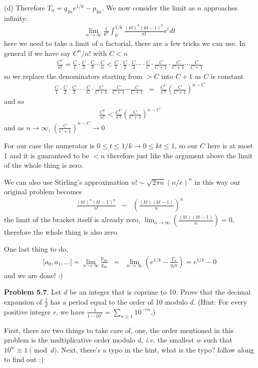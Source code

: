 \documentclass[aps,preprint,preprintnumbers,nofootinbib,showpacs,prd]{revtex4-1}
\newcommand{\ie}{{\it i.e.} }
\newcommand{\nbea}{\begin{eqnarray*}}
\newcommand{\neea}{\end{eqnarray*}}
\begin{document}
(d) Therefore $T_n = q_{3n}e^{1/k} - p_{3n}$. We now consider the limit as $n$ approaches infinity:
%
\nbea
\lim_{n \to \infty} \frac{1}{k^n} \int_0^{1/k} \frac{(kt)^n (kt - 1)^n}{n!}e^tdt
\neea
%
here we need to take a limit of a factorial, there are a few tricks we can use. In general if we have say $C^n/n!$ with $C < n$
%
\nbea
\frac{C^n}{n!} = \frac{C}{1} \cdot \frac{C}{2} \cdot \frac{C}{3} \cdots \frac{C}{n} < \frac{C}{1} \cdot \frac{C}{2} \cdot \frac{C}{3} \cdots \cdot \frac{C}{C} \cdot \frac{C}{C+1} \cdot \frac{C}{C+1} \cdots \frac{C}{C+1}
\neea
%
so we replace the denominators starting from $> C$ into $C+1$ as $C$ is constant
%
\nbea
\frac{C}{1} \cdot \frac{C}{2} \cdot \frac{C}{3} \cdots \cdot \frac{C}{C} \cdot \frac{C}{C+1} \cdot \frac{C}{C+1} \cdots \frac{C}{C+1} & = & \frac{C^C}{C!} \left ( \frac{C}{C+1} \right )^{n-C}
\neea
%
and so
%
\nbea
\frac{C^n}{n!} < \frac{C^C}{C!} \left ( \frac{C}{C+1} \right )^{n-C}
\neea
%
and as $n \to \infty$, $\left ( \frac{C}{C+1} \right )^{n-C} \to 0$

For our case the numerator is $0 \le t \le 1/k \to 0 \le kt \le 1$, so our $C$ here is at most 1 and it is guaranteed to be $< n$ therefore just like the argument above the limit of the whole thing is zero.

We can also use Stirling's approximation $n! \sim \sqrt{2\pi n}(n/e)^n$ in this way our original problem becomes
%
\nbea
\frac{(kt)^n (kt - 1)^n}{n!} & \sim & \left ( \frac{(kt) (kt - 1)}{n} \right )^n 
\neea
%
the limit of the bracket itself is already zero, $\lim_{n\to\infty}\left ( \frac{(kt) (kt - 1)}{n} \right ) = 0$, therefore the whole thing is also zero.

One last thing to do,
%
\nbea
\lbrack a_0, a_1, \dots \rbrack = \lim_{n \to \infty} \frac{p_{3n}}{q_{3n}} & = & \lim_{n \to \infty} \left ( e^{1/k} - \frac{T_n}{q_3n}\right ) = e^{1/k} - 0
\neea
%
and we are done! :)

{\bf Problem 5.7}. Let $d$ be an integer that is coprime to 10. Prove that the decimal
expansion of $\frac{1}{d}$ has a period equal to the order of 10 modulo $d$. (Hint:
For every positive integer $r$, we have $\frac{1}{1-10^r} = \sum_{n\ge1}10^{-rn}$.)

First, there are two things to take care of, one, the order mentioned in this problem is the multiplicative order modulo $d$, \ie the smallest $w$ such that $10^w \equiv 1 \pmod{d}$. Next, there's a typo in the hint, what is the typo? follow along to find out :)
\end{document}
